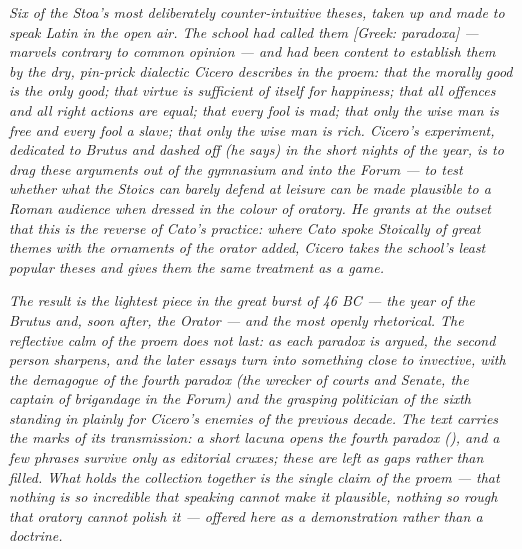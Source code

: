 
\textit{Six of the Stoa's most deliberately counter-intuitive
theses, taken up and made to speak Latin in the open air. The
school had called them \textit{[Greek: paradoxa]} --- marvels
contrary to common opinion --- and had been content to establish
them by the dry, pin-prick dialectic Cicero describes in the
proem: that the morally good is the only good; that virtue is
sufficient of itself for happiness; that all offences and all
right actions are equal; that every fool is mad; that only the
wise man is free and every fool a slave; that only the wise man
is rich. Cicero's experiment, dedicated to Brutus and dashed off
(he says) in the short nights of the year, is to drag these
arguments out of the gymnasium and into the Forum --- to test
whether what the Stoics can barely defend at leisure can be made
plausible to a Roman audience when dressed in the colour of
oratory. He grants at the outset that this is the reverse of
Cato's practice: where Cato spoke Stoically of great themes with
the ornaments of the orator added, Cicero takes the school's
least popular theses and gives them the same treatment as a
game.}

\textit{The result is the lightest piece in the great burst of
46 BC --- the year of the \textit{Brutus} and, soon after, the
\textit{Orator} --- and the most openly rhetorical. The
reflective calm of the proem does not last: as each paradox is
argued, the second person sharpens, and the later essays turn
into something close to invective, with the demagogue of the
fourth paradox (the wrecker of courts and Senate, the captain of
brigandage in the Forum) and the grasping politician of the
sixth standing in plainly for Cicero's enemies of the previous
decade. The text carries the marks of its transmission: a short
lacuna opens the fourth paradox (), and a few
phrases survive only as editorial cruxes; these are left as gaps
rather than filled. What holds the collection together is the
single claim of the proem --- that nothing is so incredible that
speaking cannot make it plausible, nothing so rough that oratory
cannot polish it --- offered here as a demonstration rather than
a doctrine.}
